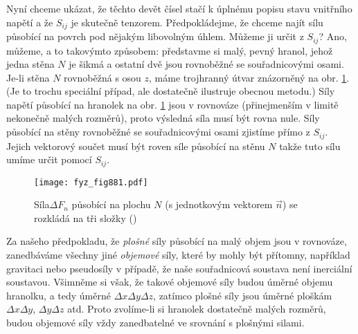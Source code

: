 {    Nyní chceme ukázat, že těchto devět čísel stačí k úplnému popisu stavu vnitřního napětí a že
    \(S_{ij}\) je skutečně tenzorem. Předpokládejme, že chceme najít sílu působící na povrch pod
    nějakým libovolným úhlem. Můžeme ji určit z \(S_{ij}\)? Ano, můžeme, a to takovýmto způsobem:
    představme si malý, pevný hranol, jehož jedna stěna \(N\) je šikmá a ostatní dvě jsou rovnoběžné
    se souřadnicovými osami. Je-li stěna \(N\) rovnoběžná s osou \(z\), máme trojhranný útvar
    znázorněný na obr. \ref{fyz:fig881}. (Je to trochu speciální případ, ale dostatečně ilustruje
    obecnou metodu.) Síly napětí působící na hranolek na obr. \ref{fyz:fig881} jsou v rovnováze
    (přinejmenším v limitě nekonečně malých rozměrů), proto výsledná síla musí být rovna nule. Síly
    působící na stěny rovnoběžné se souřadnicovými osami zjistíme přímo z \(S_{ij}\). Jejich
    vektorový součet musí být roven síle působící na stěnu \(N\) takže tuto sílu umíme určit pomocí
    \(S_{ij}\).

    \begin{figure}[ht!] %
      \centering
      \texttt{[image: fyz\_fig881.pdf]}
      \caption{Síla\(\Delta F_n\) působící na plochu \(N\) (s jednotkovým vektorem \(\vec{n}\)) se
               rozkládá na tři složky (\cite[s.~585]{Feynman02})}
      \label{fyz:fig881}
    \end{figure}

    Za našeho předpokladu, že \emph{plošné} síly působící na malý objem jsou v rovnováze,
    zanedbáváme všechny jiné \emph{objemové} síly, které by mohly být přítomny, například gravitaci
    nebo pseudosíly v případě, že naše souřadnicová soustava není inerciální soustavou. Všimněme si
    však, že takové objemové síly budou úměrné objemu hranolku, a tedy úměrné \(ΔxΔyΔz\), zatímco
    plošné síly jsou úměrné ploškám \(ΔxΔy\), \(ΔyΔz\) atd. Proto zvolíme-li si hranolek dostatečně
    malých rozměrů, budou objemové síly vždy zanedbatelné ve srovnání s plošnými silami.
    
}
